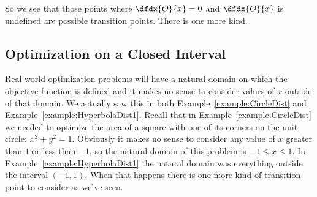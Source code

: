 So we see that those points where $\dfdx{O}{x}=0$ and $\dfdx{O}{x}$ is
undefined are possible transition points.  There is one more kind.

\subsection{Optimization on a Closed Interval}
\label{sec:optim-clos-interv}
 Real world
optimization problems will have a natural domain on which the
objective function is defined and it makes no sense to consider values
of $x$ outside of that domain. We actually saw this in
both Example~\ref{example:CircleDist} and
Example~\ref{example:HyperbolaDist1}. Recall that in  Example~\ref{example:CircleDist} we
needed to optimize the area of a square with one of its corners on the
unit circle: $x^2+y^2=1.$ Obviously it makes no sense to consider any
value of $x$ greater than $1$ or less than $-1$, so the natural domain
of this problem is $-1\le x\le 1$.
In Example~\ref{example:HyperbolaDist1} the natural domain was
everything outside the interval $(-1,1)$.
When that happens there is one more
kind of transition point to consider as we've seen.

